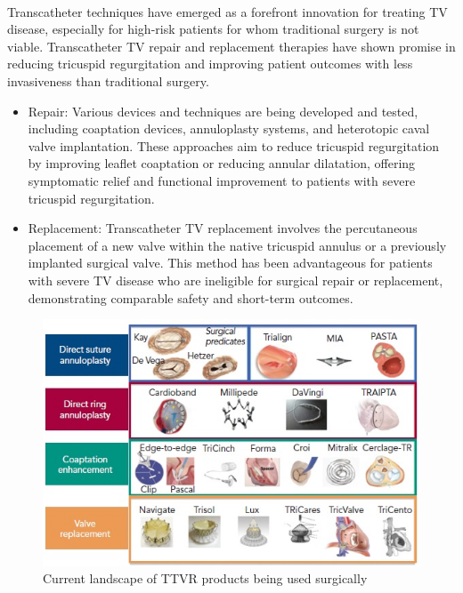 \\
Transcatheter techniques have emerged as a forefront innovation for treating \gls{TV} disease, especially for high-risk patients for whom traditional surgery is not viable. Transcatheter \gls{TV} repair and replacement therapies have shown promise in reducing tricuspid regurgitation and improving patient outcomes with less invasiveness than traditional surgery.
\begin{itemize}
    \item Repair: Various devices and techniques are being developed and tested, including coaptation devices, annuloplasty systems, and heterotopic caval valve implantation. These approaches aim to reduce tricuspid regurgitation by improving leaflet coaptation or reducing annular dilatation, offering symptomatic relief and functional improvement to patients with severe tricuspid regurgitation. ~

    \item Replacement: Transcatheter \gls{TV} replacement involves the percutaneous placement of a new valve within the native tricuspid annulus or a previously implanted surgical valve. This method has been advantageous for patients with severe \gls{TV} disease who are ineligible for surgical repair or replacement, demonstrating comparable safety and short-term outcomes. ~
\end{itemize}
\begin{figure}[H]
    \centering
    \includegraphics[width=\linewidth]{figures/TTVR.jpg}
    \caption{Current landscape of TTVR products being used surgically ~}
    \label{fig:TTVR}
\end{figure}
